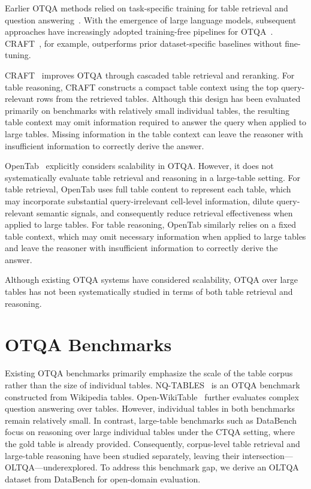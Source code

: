 Earlier OTQA methods relied on task-specific training for table retrieval and question answering~\cite{cltr,lirage}. With the emergence of large language models, subsequent approaches have increasingly adopted training-free pipelines for OTQA~\cite{opentab,craft}. CRAFT~\cite{craft}, for example, outperforms prior dataset-specific baselines without fine-tuning.

CRAFT~\cite{craft} improves OTQA through cascaded table retrieval and reranking.
For table reasoning, CRAFT constructs a compact table context using the top query-relevant rows from the retrieved tables.
Although this design has been evaluated primarily on benchmarks with relatively small individual tables, the resulting table context may omit information required to answer the query when applied to large tables.
Missing information in the table context can leave the reasoner with insufficient information to correctly derive the answer.

OpenTab~\cite{opentab} explicitly considers scalability in OTQA.
However, it does not systematically evaluate table retrieval and reasoning in a large-table setting.
For table retrieval, OpenTab uses full table content to represent each table, which may incorporate substantial query-irrelevant cell-level information, dilute query-relevant semantic signals, and consequently reduce retrieval effectiveness when applied to large tables.
For table reasoning, OpenTab similarly relies on a fixed table context, which may omit necessary information when applied to large tables and leave the reasoner with insufficient information to correctly derive the answer.

Although existing OTQA systems have considered scalability, OTQA over large tables has not been systematically studied in terms of both table retrieval and reasoning.

\section{OTQA Benchmarks}
Existing OTQA benchmarks primarily emphasize the scale of the table corpus rather than the size of individual tables.
NQ-TABLES~\cite{nqtables} is an OTQA benchmark constructed from Wikipedia tables.
Open-WikiTable~\cite{openwikitable} further evaluates complex question answering over tables.
However, individual tables in both benchmarks remain relatively small.
In contrast, large-table benchmarks such as DataBench~\cite{databench} focus on reasoning over large individual tables under the CTQA setting, where the gold table is already provided.
Consequently, corpus-level table retrieval and large-table reasoning have been studied separately, leaving their intersection---OLTQA---underexplored.
To address this benchmark gap, we derive an OLTQA dataset from DataBench for open-domain evaluation.

